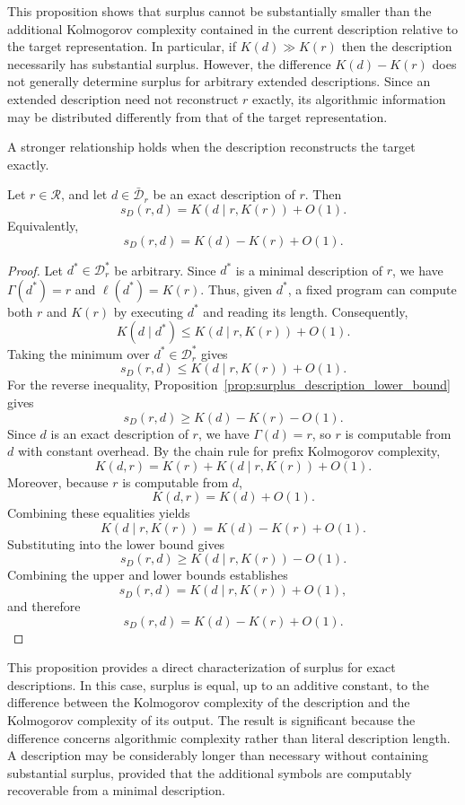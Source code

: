 This proposition shows that surplus cannot be substantially smaller than the additional Kolmogorov complexity contained in the current description relative to the target representation. In particular, if $K(d)\gg K(r)$ then the description necessarily has substantial surplus. However, the difference $K(d)-K(r)$ does not generally determine surplus for arbitrary extended descriptions. Since an extended description need not reconstruct $r$ exactly, its algorithmic information may be distributed differently from that of the target representation.

A stronger relationship holds when the description reconstructs the target exactly.

\begin{proposition}
\label{prop:surplus_exact_description}
Let $r\in\mathcal R$, and let $d\in\bar{\mathcal D}_r$ be an exact description of $r$. Then
\[
s_D(r,d) = K(d\mid r,K(r)) + O(1).
\]
Equivalently,
\[
s_D(r,d) = K(d) - K(r) + O(1).
\]
\end{proposition}
\begin{proof}
Let $d^\ast\in\mathcal D_r^\ast$ be arbitrary. Since $d^\ast$ is a minimal description of $r$, we have $\Gamma(d^\ast)=r$ and $\ell(d^\ast)=K(r)$. Thus, given $d^\ast$, a fixed program can compute both $r$ and $K(r)$ by executing $d^\ast$ and reading its length. Consequently,
\[
K(d\mid d^\ast) \le K(d\mid r,K(r))+O(1).
\]
Taking the minimum over $d^\ast\in\mathcal D_r^\ast$ gives
\[
s_D(r,d) \le K(d\mid r,K(r))+O(1).
\]
For the reverse inequality, Proposition~\ref{prop:surplus_description_lower_bound} gives
\[
s_D(r,d)\ge K(d)-K(r)-O(1).
\]
Since $d$ is an exact description of $r$, we have $\Gamma(d)=r$, so $r$ is computable from $d$ with constant overhead. By the chain rule for prefix Kolmogorov complexity,
\[
K(d,r) = K(r)+K(d\mid r,K(r))+O(1).
\]
Moreover, because $r$ is computable from $d$,
\[
K(d,r)=K(d)+O(1).
\]
Combining these equalities yields
\[
K(d\mid r,K(r)) = K(d)-K(r)+O(1).
\]
Substituting into the lower bound gives
\[
s_D(r,d) \ge K(d\mid r,K(r))-O(1).
\] 
Combining the upper and lower bounds establishes
\[
s_D(r,d) = K(d\mid r,K(r))+O(1),
\]
and therefore
\[
s_D(r,d) = K(d)-K(r)+O(1).
\]
\end{proof}

This proposition provides a direct characterization of surplus for exact descriptions. In this case, surplus is equal, up to an additive constant, to the difference between the Kolmogorov complexity of the description and the Kolmogorov complexity of its output. The result is significant because the difference concerns algorithmic complexity rather than literal description length. A description may be considerably longer than necessary without containing substantial surplus, provided that the additional symbols are computably recoverable from a
minimal description.

